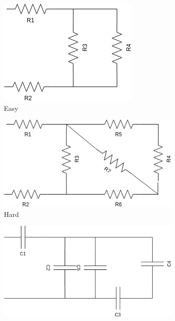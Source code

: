 \documentclass[addpoints]{exam}
\begin{document}
\begin{figure}[h]
\begin{subfigure}{.5\textwidth}
  \centering
  \includegraphics[width=0.8\linewidth]{ResistenzeEasy.png}
  \caption{Easy}
  \label{fig:sfig1}
\end{subfigure}%
\begin{subfigure}{.5\textwidth}
  \centering
  \includegraphics[width=1\linewidth]{ResistenzeHard.png}
  \caption{Hard}
  \label{fig:sfig2}
\end{subfigure}
\begin{subfigure}{.5\textwidth}
  \centering
  \includegraphics[width=1\linewidth]{CondensatoriMedium.png}

\end{subfigure}
\end{figure}
\end{document}
